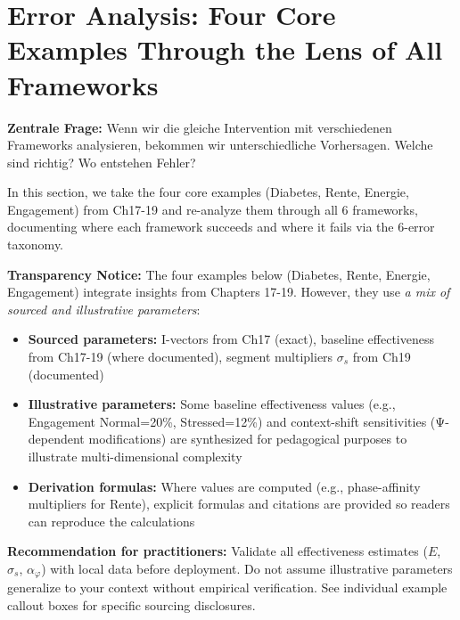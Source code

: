 \section{Error Analysis: Four Core Examples Through the Lens of All Frameworks}
\label{sec:20-error-analysis}

\textbf{Zentrale Frage:} Wenn wir die gleiche Intervention mit verschiedenen Frameworks analysieren, bekommen wir unterschiedliche Vorhersagen. Welche sind richtig? Wo entstehen Fehler?

In this section, we take the four core examples (Diabetes, Rente, Energie, Engagement) from Ch17-19 and re-analyze them through all 6 frameworks, documenting where each framework succeeds and where it fails via the 6-error taxonomy.


\begin{tcolorbox}[colback=orange!5!white, colframe=orange!75!black,
    title=\textbf{AUTHOR NOTE: Parameter Sourcing in Worked Examples}]

\textbf{Transparency Notice:} The four examples below (Diabetes, Rente, Energie, Engagement) integrate insights from Chapters 17-19. However, they use \textit{a mix of sourced and illustrative parameters}:

\begin{itemize}[nosep]
    \item \textbf{Sourced parameters:} I-vectors from Ch17 (exact), baseline effectiveness from Ch17-19 (where documented), segment multipliers $\sigma_s$ from Ch19 (documented)
    \item \textbf{Illustrative parameters:} Some baseline effectiveness values (e.g., Engagement Normal=20\%, Stressed=12\%) and context-shift sensitivities (Ψ-dependent modifications) are synthesized for pedagogical purposes to illustrate multi-dimensional complexity
    \item \textbf{Derivation formulas:} Where values are computed (e.g., phase-affinity multipliers for Rente), explicit formulas and citations are provided so readers can reproduce the calculations
\end{itemize}

\textbf{Recommendation for practitioners:} Validate all effectiveness estimates ($E$, $\sigma_s$, $\alpha_\varphi$) with local data before deployment. Do not assume illustrative parameters generalize to your context without empirical verification. See individual example callout boxes for specific sourcing disclosures.

\end{tcolorbox}

